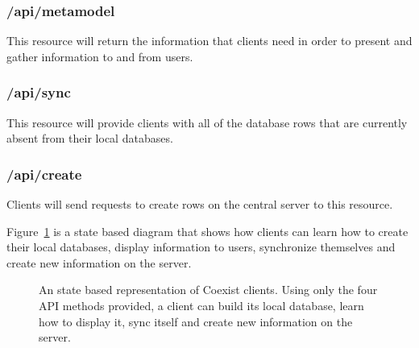 \subsubsection{/api/metamodel}  \label{sec:api_metamodel}
This resource will return the information that clients need in order to present
and gather information to and from users.

\subsubsection{/api/sync}  \label{sec:api_sync}
This resource will provide clients with all of the database rows that are
currently absent from their local databases.

\subsubsection{/api/create}  \label{sec:api_create}
Clients will send requests to create rows on the central server to this
resource.

Figure~\ref{fig:client_states} is a state based diagram that shows how clients can
learn how to create their local databases, display information to users,
synchronize themselves and create new information on the server. 

\begin{figure}[h!]
\centering
{}
\caption{An state based representation of Coexist clients. Using only the four
API methods provided, a client can build its local database, learn how to
display it, sync itself and create new information on the server.}
\label{fig:client_states}
\end{figure}

